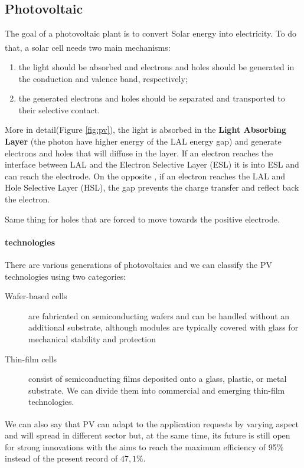 \subsection{Photovoltaic}
The goal of a photovoltaic plant is to convert Solar energy into electricity. To do that, a solar cell needs two main mechanisms\textsuperscript{\cite{PV2020}}:
\begin{enumerate}
    \item the light should be absorbed and electrons and holes should be generated in the conduction and valence band, respectively;
    \item the generated electrons and holes should be separated and transported to their selective contact.
\end{enumerate}


More in detail(Figure \ref{fig:pv}), the light is absorbed in the \textbf{Light Absorbing Layer }(the photon have higher energy of the LAL energy gap) and generate electrons and holes that will diffuse in the layer. 
If an electron reaches the interface between LAL and the Electron Selective Layer (ESL) it is into ESL and can reach the electrode. 
On the opposite , if an electron reaches the LAL and Hole Selective Layer (HSL), the gap prevents the charge transfer and reflect back the electron.

Same thing for holes that are forced to move towards the positive electrode.

\paragraph{technologies}
There are various generations of photovoltaics and we can classify the PV technologies using two categories:
\begin{description}
    \item[Wafer-based cells]  are fabricated on semiconducting wafers and can be handled without an additional substrate, although modules are typically covered with glass for mechanical stability and protection
    \item[Thin-film cells]  consist of semiconducting films deposited onto a glass, plastic, or metal substrate. We can divide them into commercial and emerging thin-film technologies.
\end{description}

We can also say\textsuperscript{\cite{PV2020}} that PV can adapt to the application requests by varying aspect and will spread in different sector but, at the same time, its future is still open for strong innovations with the aims to reach the maximum efficiency of 95\% instead of the present record of $47,1\%$.

